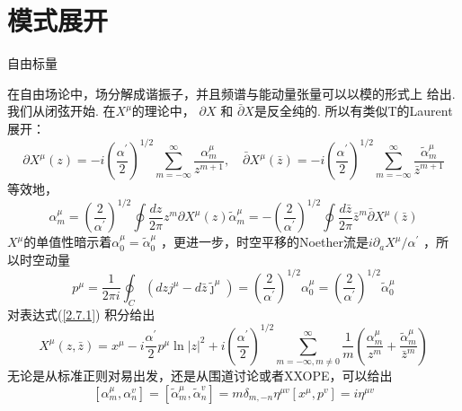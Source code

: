 \section{模式展开}%

\centerline{\Large 自由标量}
在自由场论中，场分解成谐振子，并且频谱与能动量张量可以以模的形式上
给出. 我们从闭弦开始. 在$X^\mu$的理论中， $\partial X$ 和 $\bar{\partial} X$是反全纯的. 所以有类似T的Laurent展开：
\begin{equation}\label{2.7.1}
\partial X^{\mu}(z)=-i\left(\frac{\alpha^{\prime}}{2}\right)^{1 / 2} \sum_{m=-\infty}^{\infty} \frac{\alpha_{m}^{\mu}}{z^{m+1}}, \quad \bar{\partial} X^{\mu}(\bar{z})=-i\left(\frac{\alpha^{\prime}}{2}\right)^{1 / 2} \sum_{m=-\infty}^{\infty} \frac{\tilde{\alpha}_{m}^{\mu}}{\bar{z}^{m+1}}
\end{equation}
等效地，
\begin{subequations}\label{2.7.2}
\begin{equation}
\alpha_{m}^{\mu}=\left(\frac{2}{\alpha^{\prime}}\right)^{1 / 2} \oint \frac{d z}{2 \pi} z^{m} \partial X^{\mu}(z)
\end{equation}
\begin{equation}
\tilde{\alpha}_{m}^{\mu}=-\left(\frac{2}{\alpha^{\prime}}\right)^{1 / 2} \oint \frac{d \bar{z}}{2 \pi} \bar{z}^{m} \bar{\partial} X^{\mu}(\bar{z})
\end{equation}
\end{subequations}
 $X^\mu$的单值性暗示着$\alpha_{0}^{\mu}=\tilde{\alpha}_{0}^{\mu}$ ，更进一步，时空平移的Noether流是$i \partial_{a} X^{\mu} / \alpha^{\prime}$ ，所以时空动量
\begin{equation}\label{2.7.3}
p^{\mu}=\frac{1}{2 \pi i} \oint_{C}\left(d z j^{\mu}-d \bar{z} \tilde{\jmath}^{\mu}\right)=\left(\frac{2}{\alpha^{\prime}}\right)^{1 / 2} \alpha_{0}^{\mu}=\left(\frac{2}{\alpha^{\prime}}\right)^{1 / 2} \tilde{\alpha}_{0}^{\mu}
\end{equation}
对表达式(\ref{2.7.1}) 积分给出
\begin{equation}
X^{\mu}(z, \bar{z})=x^{\mu}-i \frac{\alpha^{\prime}}{2} p^{\mu} \ln |z|^{2}+i\left(\frac{\alpha^{\prime}}{2}\right)^{1 / 2} \sum_{m=-\infty , m \neq 0}^{\infty} \frac{1}{m}\left(\frac{\alpha_{m}^{\mu}}{z^{m}}+\frac{\tilde{\alpha}_{m}^{\mu}}{\bar{z}^{m}}\right)
\end{equation}
无论是从标准正则对易出发，还是从围道讨论或者XXOPE，可以给出
\begin{subequations}
\begin{equation}
\left[\alpha_{m}^{\mu}, \alpha_{n}^{v}\right]=\left[\tilde{\alpha}_{m}^{\mu}, \tilde{\alpha}_{n}^{v}\right]=m \delta_{m,-n} \eta^{\mu v}
\end{equation}
\begin{equation}
\left[x^{\mu}, p^{v}\right]=i \eta^{\mu v}
\end{equation}
\end{subequations}
